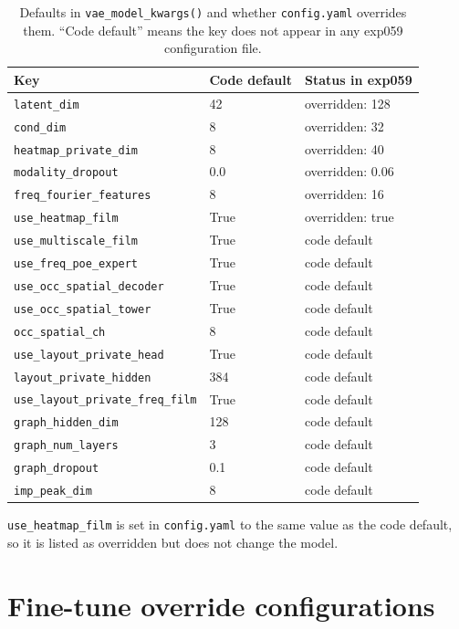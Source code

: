 \begin{table}[htbp]
\centering
\caption{Defaults in \texttt{vae\_model\_kwargs()} and whether \texttt{config.yaml}
overrides them. ``Code default'' means the key does not appear in any exp059
configuration file.}
\label{tab:appb_code_defaults}
\begin{tabular}{@{}lll@{}}
\hline
Key & Code default & Status in exp059 \\
\hline
\texttt{latent\_dim} & 42 & overridden: 128 \\
\texttt{cond\_dim} & 8 & overridden: 32 \\
\texttt{heatmap\_private\_dim} & 8 & overridden: 40 \\
\texttt{modality\_dropout} & 0.0 & overridden: 0.06 \\
\texttt{freq\_fourier\_features} & 8 & overridden: 16 \\
\texttt{use\_heatmap\_film} & True & overridden: true \\
\texttt{use\_multiscale\_film} & True & code default \\
\texttt{use\_freq\_poe\_expert} & True & code default \\
\texttt{use\_occ\_spatial\_decoder} & True & code default \\
\texttt{use\_occ\_spatial\_tower} & True & code default \\
\texttt{occ\_spatial\_ch} & 8 & code default \\
\texttt{use\_layout\_private\_head} & True & code default \\
\texttt{layout\_private\_hidden} & 384 & code default \\
\texttt{use\_layout\_private\_freq\_film} & True & code default \\
\texttt{graph\_hidden\_dim} & 128 & code default \\
\texttt{graph\_num\_layers} & 3 & code default \\
\texttt{graph\_dropout} & 0.1 & code default \\
\texttt{imp\_peak\_dim} & 8 & code default \\
\hline
\end{tabular}
\end{table}

\texttt{use\_heatmap\_film} is set in \texttt{config.yaml} to the same value as the code
default, so it is listed as overridden but does not change the model.

\section{Fine-tune override configurations}
\label{sec:appb_finetune_configs}

